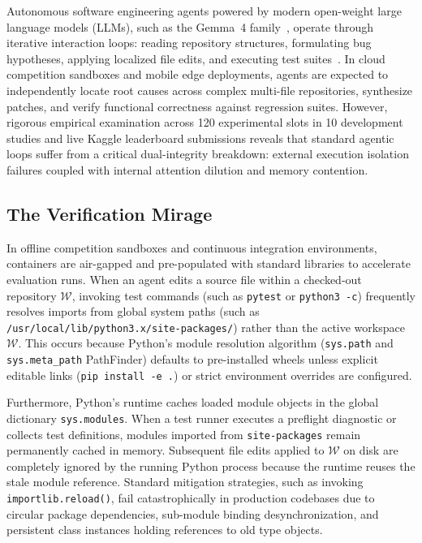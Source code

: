 \documentclass[10pt,twocolumn]{article}
\begin{document}
Autonomous software engineering agents powered by modern open-weight large language models (LLMs), such as the Gemma~4 family~\cite{gemma2024}, operate through iterative interaction loops: reading repository structures, formulating bug hypotheses, applying localized file edits, and executing test suites~\cite{jimenez2024swebench,yang2024sweagent,xia2024agentless}. In cloud competition sandboxes and mobile edge deployments, agents are expected to independently locate root causes across complex multi-file repositories, synthesize patches, and verify functional correctness against regression suites. However, rigorous empirical examination across 120 experimental slots in 10 development studies and live Kaggle leaderboard submissions reveals that standard agentic loops suffer from a critical dual-integrity breakdown: external execution isolation failures coupled with internal attention dilution and memory contention.

\subsection{The Verification Mirage}
In offline competition sandboxes and continuous integration environments, containers are air-gapped and pre-populated with standard libraries to accelerate evaluation runs. When an agent edits a source file within a checked-out repository $\mathcal{W}$, invoking test commands (such as \texttt{pytest} or \texttt{python3 -c}) frequently resolves imports from global system paths (such as \texttt{/usr/local/lib/python3.x/site-packages/}) rather than the active workspace $\mathcal{W}$. This occurs because Python's module resolution algorithm (\texttt{sys.path} and \texttt{sys.meta\_path} PathFinder) defaults to pre-installed wheels unless explicit editable links (\texttt{pip install -e .}) or strict environment overrides are configured.

Furthermore, Python's runtime caches loaded module objects in the global dictionary \texttt{sys.modules}. When a test runner executes a preflight diagnostic or collects test definitions, modules imported from \texttt{site-packages} remain permanently cached in memory. Subsequent file edits applied to $\mathcal{W}$ on disk are completely ignored by the running Python process because the runtime reuses the stale module reference. Standard mitigation strategies, such as invoking \texttt{importlib.reload()}, fail catastrophically in production codebases due to circular package dependencies, sub-module binding desynchronization, and persistent class instances holding references to old type objects.
\end{document}

